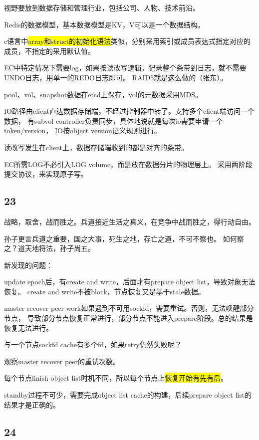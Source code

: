 视野要放到数据存储和管理行业，包括公司、人物、技术前沿。

\hrulefill

Redis的数据模型，基本数据模型是KV，V可以是一个数据结构。

\hrulefill

c语言中\hl{array和struct的初始化语法}类似，分别采用索引或成员表达式指定对应的成员，不指定的采用默认值。

EC中特定情况下需要log，如果按读改写逻辑，记录整个条带到日志，就不需要UNDO日志，用单一的REDO日志即可。
RAID5就是这么做的（张东）。

pool、vol、snapshot数据在etcd上保存，vol的元数据采用MDS。

IO路径由client直达数据存储端，不经过控制器中转了。支持多个client端访问一个数据，
有subvol controller负责同步，具体地说就是每次io需要申请一个token/version，
IO按object version语义规则进行。

读改写发生在client上，数据存储端收到的都是对齐的条带。

EC所需LOG不必引入LOG volume，而是放在数据分片的物理层上。
采用两阶段提交协议，来实现原子写。

\subsection{23}

战略，取舍，战而胜之。兵道接近生活之真义，在竞争中战而胜之，得行动自由。

孙子更言兵道之重要，国之大事，死生之地，存亡之道，不可不察也。
如何察之？道天地将法，孙子尚五。

\hrulefill

新发现的问题：

update epoch后，有create and write，后面才有prepare object list，导致对象无法恢复。
create and write不被block，节点恢复又是基于stale数据。

master recover peer work如果遇到不可用sockfd，需要重试。否则，无法唤醒部分节点，
导致部分节点恢复正常进行，部分节点不能进入prepare阶段。总的结果是恢复无法进行。

与一个节点sockfd cache有多个fd，如果retry仍然失败呢？

观察master recover peer的重试次数。

每个节点finish object list时机不同，所以每个节点上\hl{恢复开始有先有后}。

standby过程不可少，需要完成object list cache的构建，后续prepare object list的结果才是正确的。

\subsection{24}

